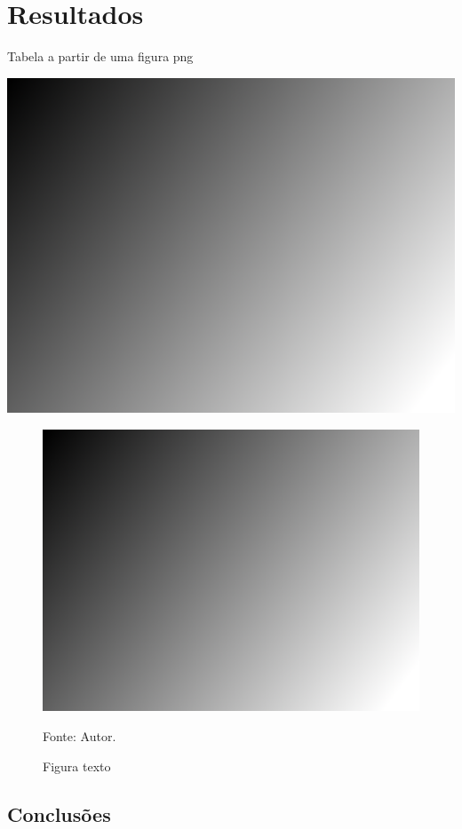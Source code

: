 \chapter{Resultados}
\label{chp:Result}

\lipsum[1-3]

\begin{table}[!htb]
	\centering
	\caption{Tabela a partir de uma figura png}
	\label{tab:RefTabelaFigura}
	\includegraphics[width=1\textwidth,keepaspectratio]{imagens/img.png} 
\end{table}

\lipsum[1-3]




\begin{figure}[!ht]
	\centering 
	\caption{Figura texto}
	\includegraphics[width=1\textwidth,keepaspectratio]{imagens/img.png} 	
	\label{fig:referenciaFigura}
	\begin{center}
		\footnotesize{Fonte: Autor.}
	\end{center}
\end{figure}


\newpage

\section{Conclusões}

\lipsum[1-3]